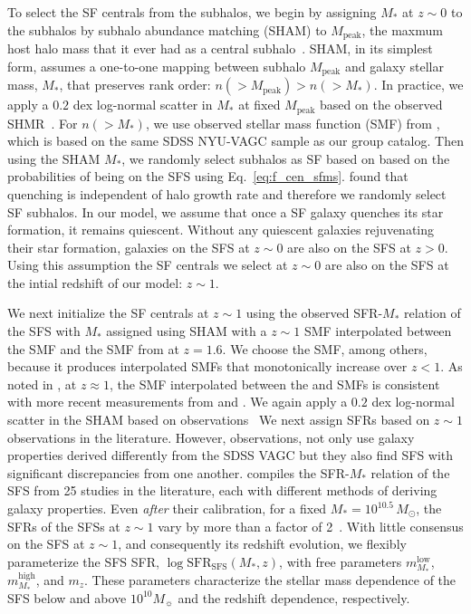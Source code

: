 \documentclass[12pt, letterpaper, preprint, tighten]{aastex62}
\begin{document}
To select the SF centrals from the subhalos, we begin by assigning $M_*$
at $z\sim 0$ to the subhalos by subhalo abundance matching (SHAM) to $M_\mathrm{peak}$,
the maxmum host halo mass that it ever had as a central subhalo~\citep{conroy2006,vale2006,yang2009,wetzel2012,leja2013,wetzel2013,wetzel2014,hahn2017b}.
SHAM, in its simplest form, assumes a one-to-one mapping between subhalo
$M_\mathrm{peak}$ and galaxy stellar mass, $M_*$, that preserves rank
order: $n({>}M_\mathrm{peak}) > n({>}M_*)$. In practice, we apply a $0.2$
dex log-normal scatter in $M_*$ at fixed $M_\mathrm{peak}$ based on the
observed SHMR~\citep[\emph{e.g.}][]{mandelbaum2006a, more2011, velander2014, zu2015, gu2016, lange2018a}.
For $n({>}M_*)$, we use observed stellar mass function (SMF)
from \cite{li2009}, which is based on the same SDSS NYU-VAGC sample as our
group catalog. Then using the SHAM $M_*$, we randomly select subhalos as
SF based on based on the probabilities of being on the SFS using Eq.~\ref{eq:f_cen_sfms}.
\cite{tinker2017b,tinker2018} found that quenching is
independent of halo growth rate and therefore we randomly select SF subhalos.
In our model, we assume that once a SF galaxy quenches its star formation,
it remains quiescent.  %
Without any quiescent galaxies rejuvenating their star formation, galaxies
on the SFS at $z\sim0$ are also on the SFS at $z > 0$. Using this assumption
the SF centrals we select at $z \sim 0$ are also on the SFS at the intial
redshift of our model: $z \sim 1$.

We next initialize the SF centrals at $z\sim1$ using the observed SFR-$M_*$
relation of the SFS with $M_*$ assigned using SHAM with a $z\sim1$ SMF
interpolated between the \cite{li2009} SMF and the SMF from \cite{marchesini2009}
at $z = 1.6$. We choose the \cite{marchesini2009} SMF, among others, because it
produces interpolated SMFs that monotonically increase over $z < 1$. As noted
in \cite{hahn2017b}, at $z \approx 1$, the SMF interpolated between the
\cite{li2009} and \cite{marchesini2009} SMFs is consistent with more recent
measurements from \cite{muzzin2013} and \cite{ilbert2013}. We again apply a
$0.2$ dex log-normal scatter in the SHAM based on observations~\citep[\emph{e.g.}][]{leauthaud2012, tinker2013, patel2015}
We next assign SFRs based on $z \sim 1$ observations in the literature.
However, observations, not only use galaxy properties derived differently
from the SDSS VAGC but they also find SFS with significant discrepancies
from one another. \cite{speagle2014} compiles the SFR-$M_*$ relation of the
SFS from 25 studies in the literature, each with different methods of deriving
galaxy properties. Even \emph{after} their calibration, for a fixed
$M_* = 10^{10.5}\, M_\odot$, the SFRs of the SFSs at $z \sim 1$
vary by more than a factor of 2~\citep[see Figure 2 of][]{speagle2014}.
With little consensus on the SFS at $z\sim1$, and consequently its redshift
evolution, we flexibly parameterize the SFS SFR,
$\log\mathrm{SFR}_\mathrm{SFS}(M_*, z)$,
with free parameters $m^\mathrm{low}_{M_*}$, $m^\mathrm{high}_{M_*}$, and
$m_z$. These parameters characterize the stellar mass dependence of the SFS
below and above $10^{10} M_\sun$ and the redshift dependence, respectively.
\end{document}
